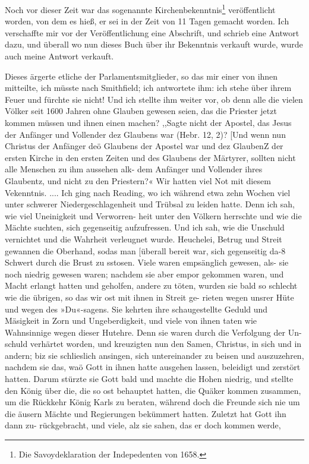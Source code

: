 Noch vor dieser Zeit war das sogenannte 
Kirchenbekenntnis\footnote{Die Savoydeklaration der 
Indepedenten von 1658.}
veröffentlicht worden, von dem es hieß, er sei in der Zeit von
11 Tagen gemacht worden. Ich verschaffte mir vor der 
Veröffentlichung eine Abschrift, und schrieb eine Antwort dazu, und
überall wo nun dieses Buch über ihr Bekenntnis verkauft wurde,
wurde auch meine Antwort verkauft.  

Dieses ärgerte etliche der
Parlamentsmitglieder, so das mir einer von ihnen mitteilte, ich
müsste nach Smithfield; ich antwortete ihm: 
ich stehe über ihrem
Feuer und fürchte sie nicht! Und ich stellte ihm weiter vor, ob
denn alle die vielen Völker seit 1600 Jahren ohne Glauben 
gewesen seien, das die Priester jetzt kommen müssen und ihnen einen
machen? ,,Sagte nicht der Apostel, das Jesus der Anfänger und
Vollender dez Glaubens war (Hebr. 12, 2)? [Und wenn nun
Christus der Anfänger deö Glaubens der Apostel war und dez
GlaubenZ der ersten Kirche in den ersten Zeiten und des Glaubens
der Märtyrer, sollten nicht alle Menschen zu ihm aussehen alk-
dem Anfänger und Vollender ihres Glaubentz, und nicht zu den
Priestern?« Wir hatten viel Not mit diesem Vekenntnis. ....
Ich ging nach Reading, wo ich während etwa zehn Wochen
viel unter schwerer Niedergeschlagenheit und Trübsal zu leiden
hatte. Denn ich sah, wie viel Uneinigkeit und Verworren-
heit unter den Völkern herrschte und wie die Mächte suchten, sich
gegenseitig aufzufressen. Und ich sah, wie die Unschuld vernichtet
und die Wahrheit verleugnet wurde. Heuchelei, Betrug und
Streit gewannen die Oberhand, sodas man [überall bereit war,
sich gegenseitig da-8 Schwert durch die Brust zu sstosen. Viele
waren empsänglich gewesen, als- sie noch niedrig gewesen waren;
nachdem sie aber empor gekommen waren, und Macht erlangt
hatten und geholfen, andere zu töten, wurden sie bald so
schlecht wie die übrigen, so das wir ost mit ihnen in Streit ge-
rieten wegen unsrer Hüte und wegen des »Du«-sagens. Sie
kehrten ihre schaugestellte Geduld und Mäsigkeit in Zorn und
Ungeberdigkeit, und viele von ihnen taten wie Wahnsinnige wegen
dieser Hutehre. Denn sie waren durch die Verfolgung der Un-
schuld verhärtet worden, und kreuzigten nun den Samen,
Christus, in sich und in andern; biz sie schlieslich ansingen, sich
untereinander zu beisen und auszuzehren, nachdem sie das, waö
Gott in ihnen hatte ausgehen lassen, beleidigt und zerstört hatten.
Darum stürzte sie Gott bald und machte die Hohen niedrig, und
stellte den König über die, die so ost behauptet hatten, die Quäker
kommen zusammen, um die Rückkehr König Karls zu beraten,
während doch die Freunde sich nie um die äusern Mächte und
Regierungen bekümmert hatten. Zuletzt hat Gott ihn dann zu-
rückgebracht, und viele, alz sie sahen, das er doch kommen werde,



